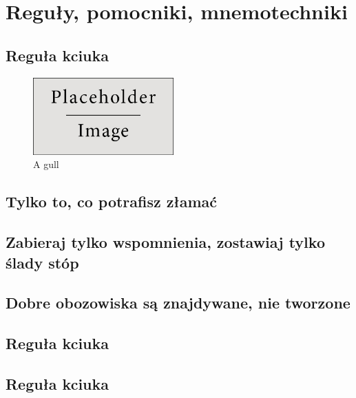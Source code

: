 \documentclass[11pt,fleqn]{book} %
\begin{document}


\chapter{Reguły, pomocniki, mnemotechniki}

\section{Reguła kciuka}\label{regula-kciuka}
\lipsum
\begin{figure}
	\begin{center}
		\includegraphics[width=0.48\textwidth]{Pictures/placeholder}
	\end{center}
	\caption{A gull}
\end{figure}

\section{Tylko to, co potrafisz złamać}\label{regula-drewno}
\section{Zabieraj tylko wspomnienia, zostawiaj tylko ślady stóp}\label{regula-zabierz-zostaw}
\section{Dobre obozowiska są znajdywane, nie tworzone}\label{regula-dobre-obozowiska}
\section{Reguła kciuka}\label{regula-kciuka}
\section{Reguła kciuka}\label{regula-kciuka}
\end{document}
